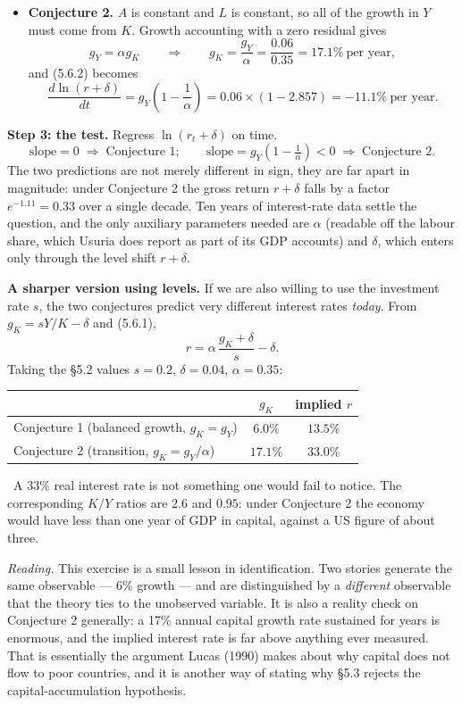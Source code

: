 \documentclass[12pt, letterpaper]{article}
\begin{document}
\begin{tcolorbox}[evenbox,title={Problem 5.6 \quad Interest Rates}]
\begin{itemize}[leftmargin=1.3em,itemsep=4pt,topsep=3pt]
\item \textbf{Conjecture 2.} $A$ is constant and $L$ is constant, so all of the growth in
      $Y$ must come from $K$. Growth accounting with a zero residual gives
      \[
      g_Y=\alpha g_K
      \qquad\Longrightarrow\qquad
      g_K=\frac{g_Y}{\alpha}=\frac{0.06}{0.35}=17.1\%\ \text{per year},
      \]
      and (5.6.2) becomes
      \[
      \frac{d\ln(r+\delta)}{dt}=g_Y\left(1-\frac{1}{\alpha}\right)
      =0.06\times(1-2.857)=\boxed{-11.1\%\ \text{per year}} .
      \]
\end{itemize}

\textbf{Step 3: the test.} Regress $\ln(r_t+\delta)$ on time.
\[
\text{slope}=0 \;\Rightarrow\; \text{Conjecture 1};
\qquad
\text{slope}=g_Y\!\left(1-\tfrac{1}{\alpha}\right)<0 \;\Rightarrow\; \text{Conjecture 2}.
\]
The two predictions are not merely different in sign, they are far apart in magnitude: under
Conjecture 2 the gross return $r+\delta$ falls by a factor $e^{-1.11}=0.33$ over a single
decade. Ten years of interest-rate data settle the question, and the only auxiliary
parameters needed are $\alpha$ (readable off the labour share, which Usuria does report as
part of its GDP accounts) and $\delta$, which enters only through the level shift
$r+\delta$.

\smallskip
\textbf{A sharper version using levels.} If we are also willing to use the investment rate
$s$, the two conjectures predict very different interest rates \emph{today}. From
$g_K=sY/K-\delta$ and (5.6.1),
\[
r=\alpha\,\frac{g_K+\delta}{s}-\delta .
\]
Taking the \S5.2 values $s=0.2$, $\delta=0.04$, $\alpha=0.35$:
\begin{center}
\begin{tabular}{@{}lcc@{}}
\toprule
 & $g_K$ & implied $r$ \\
\midrule
Conjecture 1 (balanced growth, $g_K=g_Y$)   & $6.0\%$  & $13.5\%$ \\
Conjecture 2 (transition, $g_K=g_Y/\alpha$) & $17.1\%$ & $33.0\%$ \\
\bottomrule
\end{tabular}
\end{center}
\checkmark\ A 33\% real interest rate is not something one would fail to notice. The
corresponding $K/Y$ ratios are $2.6$ and $0.95$: under Conjecture 2 the economy would have
less than one year of GDP in capital, against a US figure of about three.

\smallskip
\emph{Reading.} This exercise is a small lesson in identification. Two stories generate the
same observable --- 6\% growth --- and are distinguished by a \emph{different} observable
that the theory ties to the unobserved variable. It is also a reality check on Conjecture 2
generally: a 17\% annual capital growth rate sustained for years is enormous, and the
implied interest rate is far above anything ever measured. That is essentially the argument
Lucas (1990) makes about why capital does not flow to poor countries, and it is another way
of stating why \S5.3 rejects the capital-accumulation hypothesis.
\end{tcolorbox}
\end{document}
